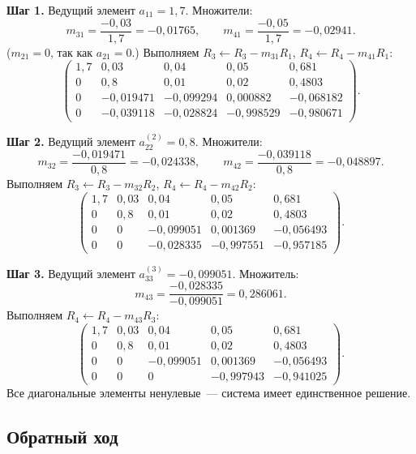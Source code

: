 \documentclass[a4paper, final]{article}
\begin{document}
\textbf{Шаг 1.} Ведущий элемент $a_{11} = 1{,}7$. Множители:
\[
m_{31} = \frac{-0{,}03}{1{,}7} = -0{,}01765, \qquad
m_{41} = \frac{-0{,}05}{1{,}7} = -0{,}02941.
\]
($m_{21} = 0$, так как $a_{21} = 0$.) Выполняем $R_3 \leftarrow R_3 - m_{31} R_1$,
$R_4 \leftarrow R_4 - m_{41} R_1$:
\[
\left(\begin{array}{cccc|c}
1{,}7 & 0{,}03       & 0{,}04       & 0{,}05       & 0{,}681    \\
0     & 0{,}8        & 0{,}01       & 0{,}02       & 0{,}4803   \\
0     & -0{,}019471  & -0{,}099294  & 0{,}000882   & -0{,}068182 \\
0     & -0{,}039118  & -0{,}028824  & -0{,}998529  & -0{,}980671
\end{array}\right).
\]

\textbf{Шаг 2.} Ведущий элемент $a_{22}^{(2)} = 0{,}8$. Множители:
\[
m_{32} = \frac{-0{,}019471}{0{,}8} = -0{,}024338, \qquad
m_{42} = \frac{-0{,}039118}{0{,}8} = -0{,}048897.
\]
Выполняем $R_3 \leftarrow R_3 - m_{32} R_2$, $R_4 \leftarrow R_4 - m_{42} R_2$:
\[
\left(\begin{array}{cccc|c}
1{,}7 & 0{,}03 & 0{,}04       & 0{,}05       & 0{,}681    \\
0     & 0{,}8  & 0{,}01       & 0{,}02       & 0{,}4803   \\
0     & 0      & -0{,}099051  & 0{,}001369   & -0{,}056493 \\
0     & 0      & -0{,}028335  & -0{,}997551  & -0{,}957185
\end{array}\right).
\]

\textbf{Шаг 3.} Ведущий элемент $a_{33}^{(3)} = -0{,}099051$. Множитель:
\[
m_{43} = \frac{-0{,}028335}{-0{,}099051} = 0{,}286061.
\]
Выполняем $R_4 \leftarrow R_4 - m_{43} R_3$:
\[
\left(\begin{array}{cccc|c}
1{,}7 & 0{,}03 & 0{,}04       & 0{,}05       & 0{,}681    \\
0     & 0{,}8  & 0{,}01       & 0{,}02       & 0{,}4803   \\
0     & 0      & -0{,}099051  & 0{,}001369   & -0{,}056493 \\
0     & 0      & 0            & -0{,}997943  & -0{,}941025
\end{array}\right).
\]
Все диагональные элементы ненулевые~--- система имеет единственное решение.

\subsection{Обратный ход}
\end{document}
